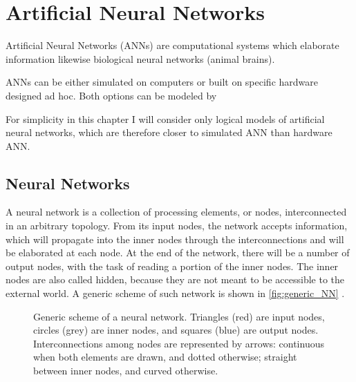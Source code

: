 \chapter{Artificial Neural Networks}
\label{ch:Artificial_Neural_Networks}

Artificial Neural Networks (ANNs) are computational systems which elaborate information likewise biological neural networks (animal brains).


\vspace{1em}
ANNs can be either simulated on computers or built on specific hardware designed ad hoc.
Both options can be modeled by 

\vspace{1em}
For simplicity in this chapter I will consider only logical models of artificial neural networks, which are therefore closer to simulated ANN than hardware ANN.


\section{Neural Networks}
\label{sec:Neural_Networks}

%	

A neural network is a collection of processing elements, or nodes, interconnected in an arbitrary topology.
From its input nodes, the network accepts information, which will propagate into the inner nodes through the interconnections and will be elaborated at each node.
At the end of the network, there will be a number of output nodes, with the task of reading a portion of the inner nodes.
The inner nodes are also called hidden, because they are not meant to be accessible to the external world.
A generic scheme of such network is shown in \autoref{fig:generic_NN} .

\begin{figure}[ht]
	\centering
	
	\caption{	Generic scheme of a neural network. %
						Triangles (red) are input nodes, circles (grey) are inner nodes, and squares (blue) are output nodes. %
						Interconnections among nodes are represented by arrows: %
						continuous when both elements are drawn, and dotted otherwise; %
						straight between inner nodes, and curved otherwise.%
						}
	\label{fig:generic_NN}
\end{figure}

